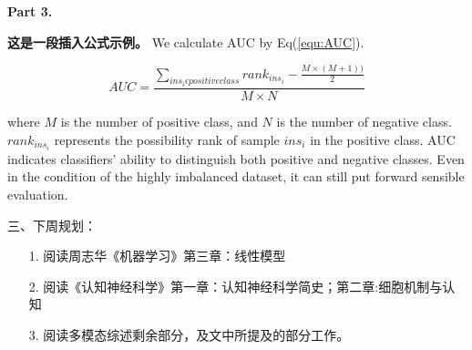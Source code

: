 \documentclass[UTF8,10.5pt]{article} %
\begin{document}
\vspace{0.5cm}
\noindent \textbf{Part 3.} 

\textbf{这是一段插入公式示例。}
We calculate AUC by Eq(\ref{equ:AUC}).

\begin{equation}
 \label{equ:AUC}
 AUC=\frac{\sum_{{ins_{i}\epsilon positiveclass}}rank_{ins_{i}}-\frac{M \times(M+1))}{2}}{M \times N}
\end{equation}

where $M$ is the number of positive class, and $N$ is the number of negative class. $rank_{ins_{i}}$ represents the possibility rank of sample $ins_{i}$ in the positive class. AUC indicates classifiers' ability to distinguish both positive and negative classes. Even in the condition of the highly imbalanced dataset, it can still put forward sensible evaluation.


\vspace{0.5cm}
\noindent 三、下周规划：
\begin{enumerate}[labelsep = .5em, leftmargin = -18pt, itemindent = 3em]
    \item [1.] 阅读周志华《机器学习》第三章：线性模型      
    \item [2.] 阅读《认知神经科学》第一章：认知神经科学简史；第二章:细胞机制与认知
    \item [3.] 阅读多模态综述剩余部分，及文中所提及的部分工作。
\end{enumerate}


\newpage



\end{document}
